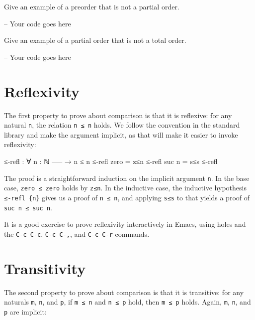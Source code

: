 Give an example of a preorder that is not a partial order.

\begin{fence}
\begin{code}
-- Your code goes here
\end{code}
\end{fence}

Give an example of a partial order that is not a total order.

\begin{fence}
\begin{code}
-- Your code goes here
\end{code}
\end{fence}

\hypertarget{reflexivity}{%
\section{Reflexivity}\label{reflexivity}}

The first property to prove about comparison is that it is reflexive:
for any natural \texttt{n}, the relation \texttt{n\ ≤\ n} holds. We
follow the convention in the standard library and make the argument
implicit, as that will make it easier to invoke reflexivity:

\begin{fence}
\begin{code}
≤-refl : ∀ {n : ℕ}
    -----
  → n ≤ n
≤-refl {zero} = z≤n
≤-refl {suc n} = s≤s ≤-refl
\end{code}
\end{fence}

The proof is a straightforward induction on the implicit argument
\texttt{n}. In the base case, \texttt{zero\ ≤\ zero} holds by
\texttt{z≤n}. In the inductive case, the inductive hypothesis
\texttt{≤-refl\ \{n\}} gives us a proof of \texttt{n\ ≤\ n}, and
applying \texttt{s≤s} to that yields a proof of
\texttt{suc\ n\ ≤\ suc\ n}.

It is a good exercise to prove reflexivity interactively in Emacs, using
holes and the \texttt{C-c\ C-c}, \texttt{C-c\ C-,}, and
\texttt{C-c\ C-r} commands.

\hypertarget{transitivity}{%
\section{Transitivity}\label{transitivity}}

The second property to prove about comparison is that it is transitive:
for any naturals \texttt{m}, \texttt{n}, and \texttt{p}, if
\texttt{m\ ≤\ n} and \texttt{n\ ≤\ p} hold, then \texttt{m\ ≤\ p} holds.
Again, \texttt{m}, \texttt{n}, and \texttt{p} are implicit:

